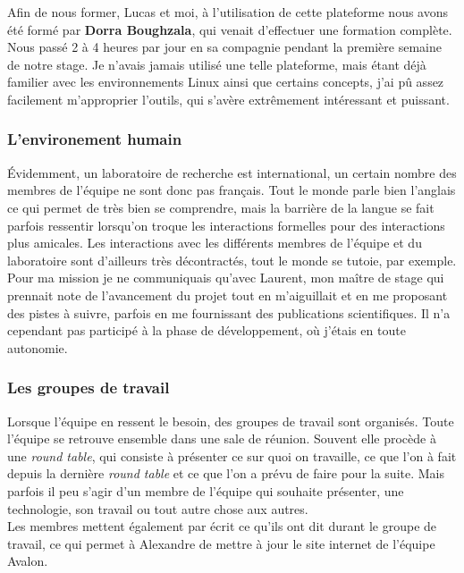 Afin de nous former, Lucas et moi, à l'utilisation de cette plateforme nous avons été formé par \textbf{Dorra Boughzala}, qui venait d'effectuer une formation complète. Nous passé 2 à 4 heures par jour en sa compagnie pendant la première semaine de notre stage. Je n'avais jamais utilisé une telle plateforme, mais étant déjà familier avec les environnements Linux ainsi que certains concepts, j'ai pû assez facilement m'approprier l'outils, qui s'avère extrêmement intéressant et puissant.
 
\subsubsection{L'environement humain}
Évidemment, un laboratoire de recherche est international, un certain nombre des membres de l'équipe ne sont donc pas français. Tout le monde parle bien l'anglais ce qui permet de très bien se comprendre, mais la barrière de la langue se fait parfois ressentir lorsqu'on troque les interactions formelles pour des interactions plus amicales. Les interactions avec les différents membres de l'équipe et du laboratoire sont d'ailleurs très décontractés, tout le monde se tutoie, par exemple.\\

Pour ma mission je ne communiquais qu'avec Laurent, mon maître de stage qui prennait note de l'avancement du projet tout en m'aiguillait et en me proposant des pistes à suivre, parfois en me fournissant des publications scientifiques. Il n'a cependant pas participé à la phase de développement, où j'étais en toute autonomie.

\subsubsection{Les groupes de travail}
Lorsque l'équipe en ressent le besoin, des groupes de travail sont organisés. Toute l'équipe se retrouve ensemble dans une sale de réunion. Souvent elle procède à une \emph{round table}, qui consiste à présenter ce sur quoi on travaille, ce que l'on à fait depuis la dernière \emph{round table} et ce que l'on a prévu de faire pour la suite. Mais parfois il peu s'agir d'un membre de l'équipe qui souhaite présenter, une technologie, son travail ou tout autre chose aux autres.\\
Les membres mettent également par écrit ce qu'ils ont dit durant le groupe de travail, ce qui permet à Alexandre de mettre à jour le site internet de l'équipe Avalon.